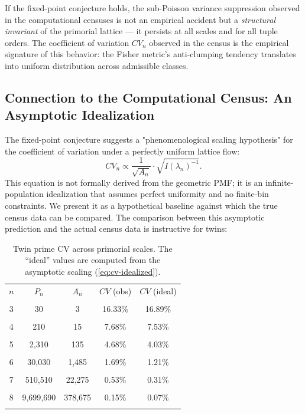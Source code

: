 \documentclass[11pt]{article}
\theoremstyle{remark}
\begin{document}
If the fixed-point conjecture holds, the sub-Poisson variance
suppression observed in the computational censuses is not an empirical
accident but a \emph{structural invariant} of the primorial lattice
— it persists at all scales and for all tuple orders. The coefficient
of variation $CV_n$ observed in the census is the empirical signature
of this behavior: the Fisher metric's anti-clumping tendency translates
into uniform distribution across admissible classes.

\subsection{Connection to the Computational Census: An Asymptotic Idealization}

The fixed-point conjecture suggests a "phenomenological scaling hypothesis" for the
coefficient of variation under a perfectly uniform lattice flow:
\begin{equation}
CV_n \propto \frac{1}{\sqrt{A_n}} \cdot \sqrt{I(\lambda_n)^{-1}}.
\label{eq:cv-idealized}
\end{equation}
This equation is not formally derived from the geometric PMF; it is an
infinite-population idealization that assumes perfect uniformity and no
finite-bin constraints. We present it as a hypothetical baseline against
which the true census data can be compared. The comparison between this
asymptotic prediction and the actual census data is instructive
for twins:

\begin{table}[h]
\centering
\begin{tabular}{ccccc}
\toprule
$n$ & $P_n$ & $A_n$ & $CV$ (obs) & $CV$ (ideal) \\\\
\midrule
3 & 30 & 3 & 16.33\% & 16.89\% \\\\
4 & 210 & 15 & 7.68\% & 7.53\% \\\\
5 & 2,310 & 135 & 4.68\% & 4.03\% \\\\
6 & 30,030 & 1,485 & 1.69\% & 1.21\% \\\\
7 & 510,510 & 22,275 & 0.53\% & 0.31\% \\\\
8 & 9,699,690 & 378,675 & 0.15\% & 0.07\% \\\\
\bottomrule
\end{tabular}
\caption{Twin prime CV across primorial scales. The ``ideal'' values
are computed from the asymptotic scaling
(\ref{eq:cv-idealized}).}
\end{table}
\end{document}

